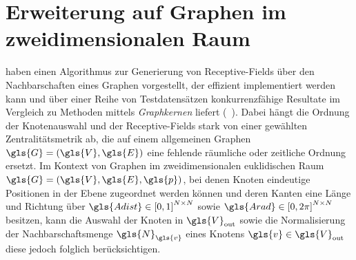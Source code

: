 \section{Erweiterung auf Graphen im zweidimensionalen Raum}
\label{raeumliche_erweiterung}

\citeauthor{patchy} haben einen Algorithmus zur Generierung von Receptive-Fields über den Nachbarschaften eines Graphen vorgestellt, der effizient implementiert werden kann und über einer Reihe von Testdatensätzen konkurrenzfähige Resultate im Vergleich zu Methoden mittels \emph{Graphkernen} liefert (\vgl{}~\cite{patchy}).
Dabei hängt die Ordnung der Knotenauswahl und der Receptive-Fields stark von einer gewählten Zentralitätsmetrik ab, die auf einem allgemeinen Graphen $\gls{G} = \left(\gls{V}, \gls{E}\right)$ eine fehlende räumliche oder zeitliche Ordnung ersetzt.
Im Kontext von Graphen im zweidimensionalen euklidischen Raum $\gls{G} = \left(\gls{V}, \gls{E}, \gls{p}\right)$, bei denen Knoten eindeutige Positionen in der Ebene zugeordnet werden können und deren Kanten eine Länge und Richtung über $\gls{Adist} \in {\left[0, 1\right]}^{N \times N}$ sowie $\gls{Arad} \in {\left[0, 2\pi\right]}^{N \times N}$ besitzen, kann die Auswahl der Knoten in $\gls{V}_{\mathrm{out}}$ sowie die Normalisierung der Nachbarschaftsmenge $\gls{N}_{\gls{v}}$ eines Knotens $\gls{v} \in \gls{V}_{\mathrm{out}}$ diese jedoch folglich berücksichtigen.


